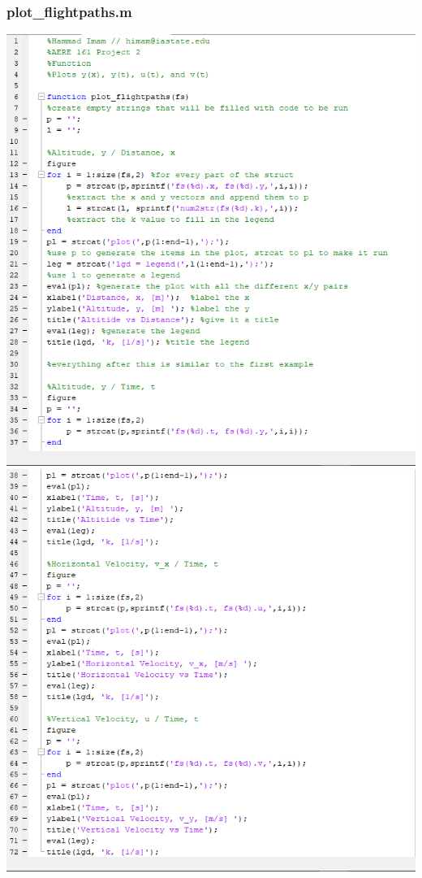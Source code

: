 \documentclass{article}
\begin{document}
\subsubsection{plot_flightpaths.m}
\includegraphics [width=\linewidth]{code_plot_flightpaths1.png}
\includegraphics [width=\linewidth]{code_plot_flightpaths2.png}
\end{document}
